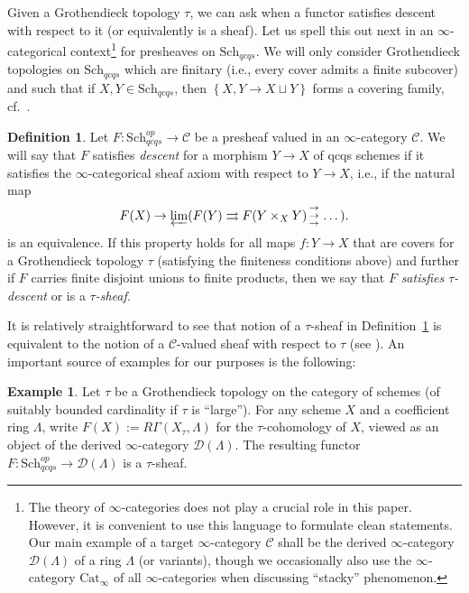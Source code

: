 \documentclass[reqno]{amsart}
\newcommand{\triplearrows}{\begin{smallmatrix} \to \\ \to \\ 
\to \end{smallmatrix} }
\newcommand{\D}{\mathcal{D}}
\theoremstyle{definition}
\newtheorem{definition}[theorem]{Definition}
\newtheorem{example}[theorem]{Example}
\begin{document}
Given a Grothendieck topology $\tau$, we can ask when a functor satisfies descent with
respect to it (or equivalently is a sheaf). Let us spell this out next in an $\infty$-categorical context\footnote{The theory of
$\infty$-categories does not play a crucial role in this paper. However, it is
convenient to use this language to formulate clean statements. Our main example
of a target $\infty$-category $\mathcal{C}$ shall be the derived
$\infty$-category $\D(\Lambda)$ of a ring $\Lambda$ (or variants), though we
occasionally also use the $\infty$-category $\mathrm{Cat}_\infty$ of all
$\infty$-categories when discussing ``stacky'' phenomenon.} for presheaves on $\mathrm{Sch}_{qcqs}$. 
We will only consider Grothendieck topologies on 
$\mathrm{Sch}_{qcqs}$ which are finitary 
(i.e., every cover admits a finite subcover) and such that if $X, Y \in \mathrm{Sch}_{qcqs}$, then $\left\{X, Y \to X
\sqcup Y\right\}$ forms a covering family, cf.~\cite[Sec.~A.3.2 and A.3.3]{SAG}. 
\begin{definition}
\label{DefDescent}
Let $F\colon  \mathrm{Sch}_{qcqs}^{op} \to \mathcal{C}$ be a presheaf valued in an $\infty$-category $\mathcal{C}$.  We will say that $F$ satisfies \emph{descent} for a morphism $Y \to X$ of qcqs schemes if it satisfies the $\infty$-categorical sheaf axiom with respect to $Y \to X$, i.e., if the natural map 
\[F(X) \to \varprojlim ( F(Y) \rightrightarrows F(Y \times_X Y) \triplearrows
\dots ).\]
is an equivalence. If this property holds for all maps $f\colon Y \to X$
that are covers for a Grothendieck topology $\tau$ (satisfying the
finiteness conditions
above)
and further if $F$ carries finite disjoint unions to finite products, then we
say that $F$ {\em satisfies $\tau$-descent} or is a {\em $\tau$-sheaf.}
\end{definition} 


It is relatively straightforward to see that notion of a $\tau$-sheaf in Definition~\ref{DefDescent} is equivalent to the notion of a $\mathcal{C}$-valued sheaf with respect to $\tau$ (see \cite[Proposition A.3.3.1]{SAG}). An important source of examples for our purposes is the following:

\begin{example}
Let $\tau$ be a Grothendieck topology on the category of schemes (of suitably
bounded cardinality if $\tau$ is ``large''). For any
scheme $X$ and a coefficient ring $\Lambda$, write $F(X) := R\Gamma(X_{\tau},
\Lambda)$ for the $\tau$-cohomology of $X$, viewed as an object of the derived
$\infty$-category $\D(\Lambda)$. The resulting functor $F\colon \mathrm{Sch}_{qcqs}^{op} \to
\D(\Lambda)$ is a $\tau$-sheaf. 
\end{example}
\end{document}
